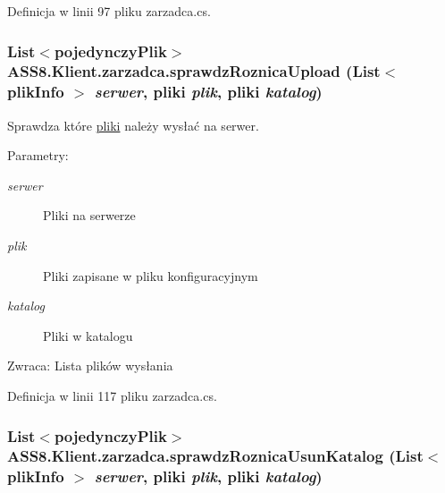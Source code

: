 Definicja w linii 97 pliku zarzadca.cs.\hypertarget{a00037_8f5d03264bce3d51a12bbda9b4fd464d}{
\subsubsection[{sprawdzRoznicaUpload}]{\setlength{\rightskip}{0pt plus 5cm}List$<${\bf pojedynczyPlik}$>$ ASS8.Klient.zarzadca.sprawdzRoznicaUpload (List$<$ {\bf plikInfo} $>$ {\em serwer}, \/  {\bf pliki} {\em plik}, \/  {\bf pliki} {\em katalog})}}
\label{d1/dc6/a00037_8f5d03264bce3d51a12bbda9b4fd464d}


Sprawdza które \hyperlink{a00017}{pliki} należy wysłać na serwer. 

\begin{Desc}
\item[Parametry:]
\begin{description}
\item[{\em serwer}]Pliki na serwerze\item[{\em plik}]Pliki zapisane w pliku konfiguracyjnym\item[{\em katalog}]Pliki w katalogu\end{description}
\end{Desc}
\begin{Desc}
\item[Zwraca:]Lista plików wysłania\end{Desc}


Definicja w linii 117 pliku zarzadca.cs.\hypertarget{a00037_a1c9556bf17ca6296a65c8ce4c2e345a}{
\subsubsection[{sprawdzRoznicaUsunKatalog}]{\setlength{\rightskip}{0pt plus 5cm}List$<${\bf pojedynczyPlik}$>$ ASS8.Klient.zarzadca.sprawdzRoznicaUsunKatalog (List$<$ {\bf plikInfo} $>$ {\em serwer}, \/  {\bf pliki} {\em plik}, \/  {\bf pliki} {\em katalog})}}
\label{d1/dc6/a00037_a1c9556bf17ca6296a65c8ce4c2e345a}


